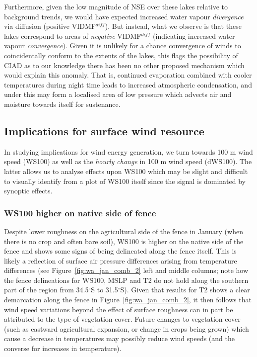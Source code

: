 Furthermore, given the low magnitude of \ac{NSE} over these lakes relative to background trends, we would have expected increased water vapour \textit{divergence} via diffusion (positive \acs{VIDMF}$^{diff}$). But instead, what we observe is that these lakes correspond to areas of \textit{negative} \acs{VIDMF}$^{diff}$ (indicating increased water vapour \textit{convergence}). Given it is unlikely for a chance convergence of winds to coincidentally conform to the extents of the lakes, this flags the possibility of \ac{CIAD} as to our knowledge there has been no other proposed mechanism which would explain this anomaly. That is, continued evaporation combined with cooler temperatures during night time leads to increased atmospheric condensation, and under this may form a localised area of low pressure which advects air and moisture towards itself for sustenance.

\subsection{Implications for surface wind resource} 

In studying implications for wind energy generation, we turn towards 100 m wind speed (\acs{WS100}) as well as the \textit{hourly change} in 100 m wind speed (\acs{dWS100}). The latter allows us to analyse effects upon \acs{WS100} which may be slight and difficult to visually identify from a plot of \ac{WS100} itself since the signal is dominated by synoptic effects.

\subsubsection{WS100 higher on native side of fence}

Despite lower roughness on the agricultural side of the fence in January (when there is no crop and often bare soil), \ac{WS100} is higher on the native side of the fence and shows some signs of being delineated along the fence itself. This is likely a reflection of surface air pressure differences arising from temperature differences (see Figure~\ref{fig:wa_jan_comb_2} left and middle columns; note how the fence delineations for \ac{WS100}, \ac{MSLP} and \ac{T2} do not hold along the southern part of the region from 34.5$^\circ$S to 31.5$^\circ$S). Given that results for \ac{T2} shows a clear demarcation along the fence in Figure~\ref{fig:wa_jan_comb_2}, it then follows that wind speed variations beyond the effect of surface roughness can in part be attributed to the type of vegetation cover. Future changes to vegetation cover (such as eastward agricultural expansion, or change in crops being grown) which cause a decrease in temperatures may possibly reduce wind speeds (and the converse for increases in temperature).

